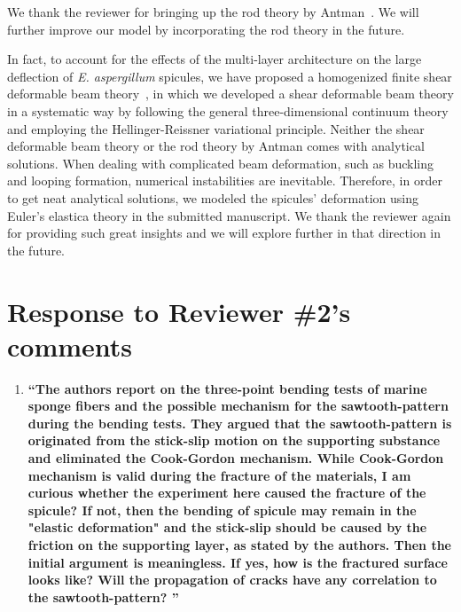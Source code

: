 \documentclass[11pt,letterpaper]{report}
\begin{document}
\begin{enumerate}[label=\textit{1.\arabic*},wide, labelwidth=!, labelindent=0pt]
We thank the reviewer for bringing up the rod theory by Antman~\cite{antman2005problems}. We will further improve our model by incorporating the rod theory in the future.

In fact, to account for the effects of the multi-layer architecture on the large deflection of \textit{E. aspergillum} spicules, we have proposed a homogenized finite shear deformable beam theory~\cite{FangShearBeam}, in which we developed a shear deformable beam theory in a systematic way by following the general three-dimensional continuum theory and employing the Hellinger-Reissner variational principle. Neither the shear deformable beam theory or the rod theory by Antman comes with analytical solutions. When dealing with complicated beam deformation, such as buckling and looping formation, numerical instabilities are inevitable. Therefore, in order to get neat analytical solutions, we modeled the spicules' deformation using Euler's elastica theory in the submitted manuscript. We thank the reviewer again for providing such great insights and we will explore further in that direction in the future.





\clearpage

\section*{Response to Reviewer \#2's comments}
\label{rev2}

\begin{enumerate}[label=\textit{2.\arabic*},wide, labelindent=0pt]

\item \label{r2c1}{\bf ``The authors report on the three-point bending tests of marine sponge fibers and the possible mechanism for the sawtooth-pattern during the bending tests. They argued that the sawtooth-pattern is originated from the stick-slip motion on the supporting substance and eliminated the Cook-Gordon mechanism.
While Cook-Gordon mechanism is valid during the fracture of the materials, I am curious whether the experiment here caused the fracture of the spicule?
If not, then the bending of spicule may remain in the "elastic deformation" and the stick-slip should be caused by the friction on the supporting layer, as stated by the authors. Then the initial argument is meaningless.
If yes, how is the fractured surface looks like? Will the propagation of cracks have any correlation to the sawtooth-pattern? ''}



\end{enumerate}
\end{enumerate}
\end{document}
